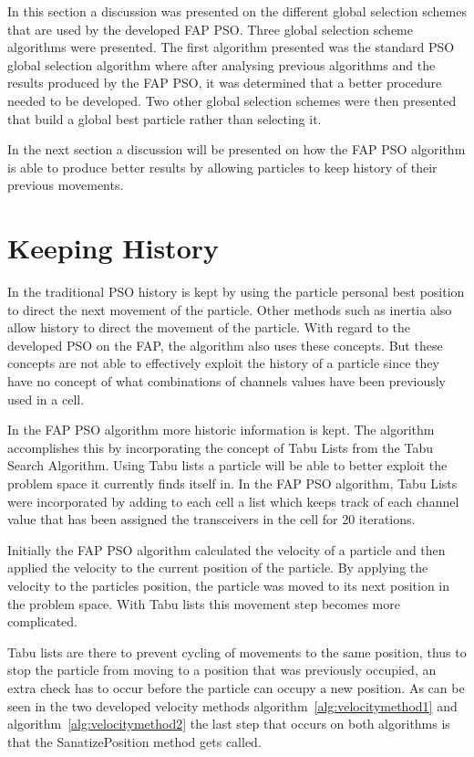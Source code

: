 In this section a discussion was presented on the different global selection schemes that are used by the developed FAP PSO. Three global selection scheme algorithms were presented. The first algorithm presented was the standard PSO global selection algorithm where after analysing previous algorithms and the results produced by the FAP PSO, it was determined that a better procedure needed to be developed. Two other global selection schemes were then presented that build a global best particle rather than selecting it.

In the next section a discussion will be presented on how the FAP PSO algorithm is able to produce better results by allowing particles to keep history of their previous movements.
\section{Keeping History}
\label{sec:keepinghistory}
In the traditional PSO history is kept by using the particle personal best position to direct the next movement of the particle. Other methods such as inertia also allow history to direct the movement of the particle. With regard to the developed PSO on the FAP, the algorithm also uses these concepts. But these concepts are not able to effectively exploit the history of a particle since they have no concept of what combinations of channels values have been previously used in a cell.

In the FAP PSO algorithm more historic information is kept. The algorithm accomplishes this by incorporating the concept of Tabu Lists from the Tabu Search Algorithm. Using Tabu lists a particle will be able to better exploit the problem space it currently finds itself in. In the FAP PSO algorithm, Tabu Lists were incorporated by adding to each cell a list which keeps track of each channel value that has been assigned the transceivers in the cell for 20 iterations.

Initially the FAP PSO algorithm calculated the velocity of a particle and then applied the velocity to the current position of the particle. By applying the velocity to the particles position, the particle was moved to its next position in the problem space. With Tabu lists this movement step becomes more complicated.

Tabu lists are there to prevent cycling of movements to the same position, thus to stop the particle from moving to a position that was previously occupied, an extra check has to occur before the particle can occupy a new position. As can be seen in the two developed velocity methods algorithm~\ref{alg:velocitymethod1} and algorithm~\ref{alg:velocitymethod2} the last step that occurs on both algorithms is that the SanatizePosition method gets called.

